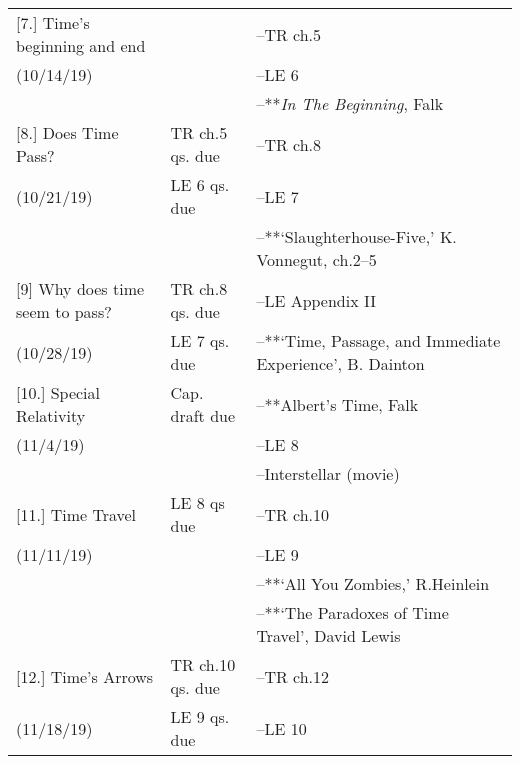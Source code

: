 \documentclass[article,oneside]{memoir}
\begin{document}
\begin{center}
\begin{longtable}{p{4.5cm}p{2.5cm}p{5cm}}
[7.] Time's beginning and end	 &   	&--TR ch.5  \\
(10/14/19)				        	&	&  --LE 6\\ 
		        	&	&  --**\emph{In The Beginning}, Falk\\ [1.8\baselineskip]


[8.] Does Time Pass?		& TR ch.5 qs. due		& --TR ch.8  \\ 
(10/21/19)			        		& LE 6 qs. due		    	  	& --LE 7 \\  
		        				&	& --**`Slaughterhouse-Five,' K. Vonnegut, ch.2--5   \\  [1.8\baselineskip] 



[9]   	Why does time seem to pass? & TR ch.8 qs. due	   		&  --LE Appendix II\\
(10/28/19)				          &  LE 7 qs. due			& --**`Time, Passage, and Immediate Experience', B. Dainton \\ [1.8\baselineskip]

[10.] Special Relativity 		& Cap. draft due		& --**Albert's Time, Falk \\
(11/4/19)				      	& 					 & --LE 8  \\  
					      	& 					 & --Interstellar (movie)  \\  [1.8\baselineskip]


[11.] Time Travel			& LE 8 qs due		& --TR ch.10  \\
(11/11/19)		            		&		      & --LE 9  \\ 
						&			& --**`All You Zombies,'  R.Heinlein \\ 
						&			& --**`The Paradoxes of Time Travel', David Lewis \\  [1.8\baselineskip]



[12.] Time's Arrows			& TR ch.10 qs. due		& --TR ch.12 \\
(11/18/19)		 			& LE 9 qs. due	    	&  --LE 10 \\ [1.8\baselineskip]



\end{longtable}
\end{center}
\end{document}
